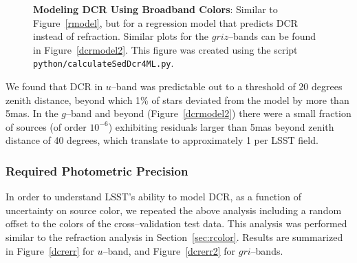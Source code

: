 \documentclass[DM,toc]{lsstdoc}
\begin{document}
\begin{figure}[!t]
    \centering
    \caption{{\bf Modeling DCR Using Broadband Colors}: Similar to
      Figure~\ref{rmodel}, but for a regression model that predicts
      DCR instead of refraction.  Similar plots for the $griz$--bands
      can be found in Figure~\ref{dcrmodel2}.  This figure was created
      using the script {\tt python/calculateSedDcr4ML.py}.}
    \label{dcrmodel}
\end{figure}

We found that DCR in $u$--band was predictable out to a threshold of
20 degrees zenith distance, beyond which 1\% of stars deviated from
the model by more than 5mas.  In the $g$--band and beyond
(Figure~\ref{dcrmodel2}) there were a small fraction of sources (of
order $10^{-6}$) exhibiting residuals larger than 5mas beyond zenith
distance of 40 degrees, which translate to approximately 1 per LSST
field.

\subsubsection{\bf Required Photometric Precision}

In order to understand LSST's ability to model DCR, as a function of
uncertainty on source color, we repeated the above analysis including
a random offset to the colors of the cross--validation test data.
This analysis was performed similar to the refraction analysis in
Section~\ref{sec:rcolor}.  Results are summarized in
Figure~\ref{dcrerr} for $u$--band, and Figure~\ref{dcrerr2} for
$gri$--bands.
\end{document}
